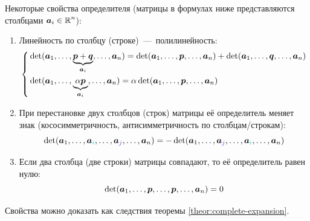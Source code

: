 \documentclass[a4paper,12pt]{article}
\begin{document}
  \begin{theorem}
    Некоторые свойства определителя (матрицы в формулах ниже представляются столбцами $\bds a_i \hm\in \RR^n$):
    \begin{enumerate}
      \item Линейность по столбцу (строке)~---~полилинейность:
        \begin{equation}\label{eq:poly-linearity}
          \left\{
            \begin{aligned}
              &\det (\boldsymbol a_1, \ldots, \underbrace{\boldsymbol p + \boldsymbol q}_{\boldsymbol a_i}, \ldots, \boldsymbol a_n)
                = \det (\boldsymbol a_1, \ldots, \boldsymbol p, \ldots, \boldsymbol a_n)
                + \det (\boldsymbol a_1, \ldots, \boldsymbol q, \ldots, \boldsymbol a_n)\\
              &\det (\boldsymbol a_1, \ldots, \underbrace{\alpha \boldsymbol p}_{\boldsymbol a_i}, \ldots, \boldsymbol a_n)
                = \alpha \det (\boldsymbol a_1, \ldots, \boldsymbol p, \ldots, \boldsymbol a_n)
            \end{aligned}
          \right.
        \end{equation}
      \item При перестановке двух столбцов (строк) матрицы её определитель меняет знак (кососимметричность, антисимметричность по столбцам/строкам):
        \begin{equation}\label{eq:row-swap}
          \det (\bds a_1, \ldots, \bds a_{\textcolor{light-cyan}{i}}, \ldots, \bds a_{\textcolor{light-purple}{j}}, \ldots, \bds a_n)
          = -\det (\bds a_1, \ldots, \bds a_{\textcolor{light-purple}{j}}, \ldots, \bds a_{\textcolor{light-cyan}{i}}, \ldots, \bds a_n)
        \end{equation}
      \item Если два столбца (две строки) матрицы совпадают, то её определитель равен нулю:
        \begin{equation}\label{eq:same-rows}
          \det (\boldsymbol a_1, \ldots, \boldsymbol p, \ldots, \boldsymbol p, \ldots, \boldsymbol a_n) = 0
        \end{equation}
    \end{enumerate}
    
  \end{theorem}
  
  Свойства можно доказать как следствия теоремы \ref{theor:complete-expansion}.
  
\end{document}
